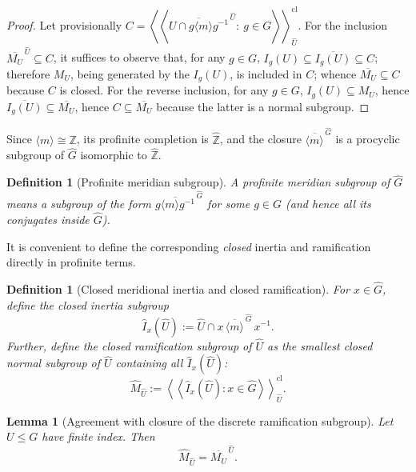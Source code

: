 \documentclass[11pt]{article}
\newtheorem{lemma}[theorem]{Lemma}
\newtheorem{definition}[theorem]{Definition}
\begin{document}
	\begin{proof}
		
		Let provisionally $C = \left\langle\!\left\langle \overline{U\cap g\langle m\rangle g^{-1}}^{\,\widehat U}:\ g\in G \right\rangle\!\right\rangle_{\widehat U}^{\mathrm{cl}}$. For the inclusion $\overline{M_U}^{\,\widehat U} \subseteq C$, it suffices to observe that, for any $g\in G$,
		$I_g(U) \subseteq \overline{I_g(U)}\subseteq C$; therefore $M_U$, being generated by the $I_g(U)$, is included in $C$; whence $\overline{M_U}\subseteq C$ because $C$ is closed.
		For the reverse inclusion, for any $g\in G$, $I_g(U)\subseteq M_U$, hence $\overline{I_g(U)}\subseteq \overline{M_U}$, hence $C\subseteq\overline{M_U}$ because the latter is a normal subgroup.\end{proof}
	

	
	Since $\langle m\rangle\cong \mathbb Z$, its profinite completion is $\widehat{\mathbb Z}$, and the closure $\overline{\langle m\rangle}^{\,\widehat G}$ is a procyclic subgroup of $\widehat{G}$ isomorphic to $\widehat{\mathbb Z}$.
	
	\begin{definition}[Profinite meridian subgroup]
		A \emph{profinite meridian subgroup} of $\widehat G$ means a subgroup of the form $\overline{g\langle m\rangle g^{-1}}^{\,\widehat G}$ for some $g\in G$ (and hence all its conjugates inside $\widehat G$).
	\end{definition}
	
	It is convenient to define the corresponding \emph{closed} inertia and ramification directly in profinite terms.
	
	\begin{definition}[Closed meridional inertia and closed ramification]
		For $x\in \widehat G$, define the \emph{closed inertia subgroup}
		\[\widehat I_x(\widehat U):=\widehat U\cap x\,\overline{\langle m\rangle}^{\,\widehat G}\,x^{-1}.\]
		Further, define the \emph{closed ramification subgroup} of $\widehat U$ as the smallest \emph{closed} normal subgroup of $\widehat{U}$ containing all $\widehat I_x(\widehat U)$:
		\[\widehat M_{\widehat U}:= \left\langle\!\left\langle \widehat I_x(\widehat U):x\in \widehat G \right\rangle\!\right\rangle_{\widehat U}^{\mathrm{cl}}.\]
	\end{definition}
	
	\begin{lemma}[Agreement with closure of the discrete ramification subgroup]\label{lem:profinite-agrees}
		Let $U\le G$ have finite index. Then \[\widehat M_{\widehat U}=\overline{M_U}^{\,\widehat U}.\]
	\end{lemma}
	
\end{document}
